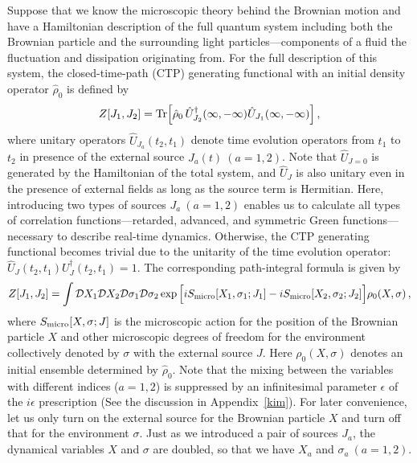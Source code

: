 \documentclass[a4paper,11pt]{article}
\begin{document}
\medskip
Suppose that we know the microscopic theory behind the Brownian motion 
and have a Hamiltonian description of the full quantum system 
including both the Brownian particle and the surrounding 
light particles---components of a fluid the fluctuation and 
dissipation originating from. 
For the full description of this system, the closed-time-path (CTP) 
generating functional with an initial density operator $\hat{\rho}_0$
is defined by
\begin{align}
 Z[J_1, J_2] 
 = 
 {\rm Tr} \Big[\hat{\rho}_0 \,
 \hat{U}_{J_2}^\dagger(\infty,-\infty)
 \hat{U}_{J_1} (\infty,-\infty) \Big]\,, 
 \label{partition}
\end{align}
where unitary operators $\hat{U}_{J_{a}}(t_2, t_1)$ denote 
time evolution operators 
from $t_1$ to $t_2$ in presence of the external source $J_a(t)~(a=1,2)$.
Note that $\hat{U}_{J=0} $ is generated by the Hamiltonian of the total system, and $\hat{U}_J $ is also unitary even in the presence of external fields as long as the source term is Hermitian. 
Here, introducing two types of sources $J_a~(a=1,2)$ enables us to calculate 
all types of correlation functions---retarded, advanced, and symmetric Green functions---necessary to describe real-time dynamics.
Otherwise, the CTP generating functional becomes trivial due to
the unitarity of the time evolution operator:
$\hat{U}_{J} (t_2,t_1) U_{J}^\dagger(t_2,t_1) = 1$. 
The corresponding path-integral formula is given by
\begin{align}
 Z[J_1,J_2]
 =\int \mathcal{D} X_1 \mathcal{D} X_2
 \mathcal{D} \sigma_1 \mathcal{D} \sigma_2
 \exp 
 \Big[iS_{\rm micro}[X_1,\sigma_1;J_1]-iS_{\rm micro}[X_2,\sigma_2;J_2] \Big]  
 \rho_0 (X,\sigma) \label{pi_micro}  \,,
\end{align}
where $S_{\rm micro}[X,\sigma;J]$ is the microscopic action 
for the position of the Brownian particle $X$ 
and other microscopic degrees of 
freedom for the environment collectively denoted by $\sigma$ 
with the external source $J$. 
Here $\rho_0 (X,\sigma)$ denotes an initial ensemble 
determined by $\hat{\rho}_0$.
Note that the mixing between the variables with different indices ($a=1,2$)
is suppressed by an infinitesimal parameter $\epsilon$ of the $i\epsilon$ 
prescription (See the discussion in Appendix~\ref{kim}).
For later convenience, let us only turn on the external source 
for the Brownian particle $X$ and turn off that for the environment $\sigma$. 
Just as we introduced a pair of sources $J_a$, 
the dynamical variables $X$ and $\sigma$ are doubled, so that we have 
 $X_a$ and $\sigma_a~(a=1,2)$. 
\end{document}
